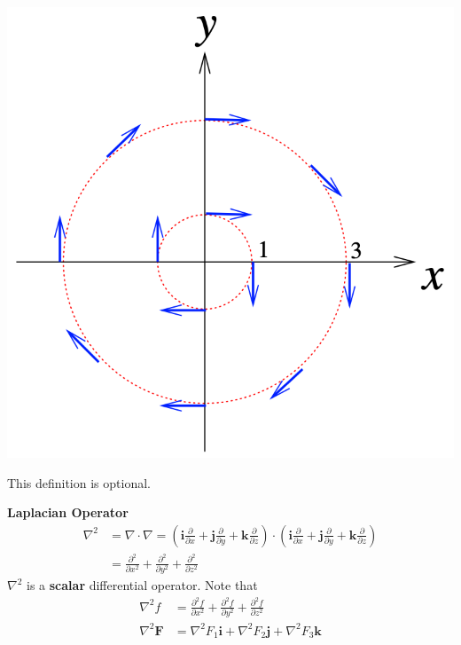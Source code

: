 \documentclass[11pt, a4paper]{MATH2023}
\begin{document}
\begin{spacing}{1.3}
    \begin{center}
        \includegraphics[scale=0.4]{images/Ch15-ex1.2.png}
    \end{center}

    \newpage
    {\blue This definition is optional.}
    
    {\bf Laplacian Operator}
    $$
    \begin{aligned}
    \nabla^{2} &=\nabla \cdot \nabla=\left(\mathbf{i} \frac{\partial}{\partial x}+\mathbf{j} \frac{\partial}{\partial y}+\mathbf{k} \frac{\partial}{\partial z}\right) \cdot\left(\mathbf{i} \frac{\partial}{\partial x}+\mathbf{j} \frac{\partial}{\partial y}+\mathbf{k} \frac{\partial}{\partial z}\right) \\
    &=\frac{\partial^{2}}{\partial x^{2}}+\frac{\partial^{2}}{\partial y^{2}}+\frac{\partial^{2}}{\partial z^{2}}
    \end{aligned}
    $$
    $\nabla^{2}$ is a {\bf scalar} differential operator. Note that
    $$
    \begin{aligned}
    \nabla^{2} f &=\frac{\partial^{2} f}{\partial x^{2}}+\frac{\partial^{2} f}{\partial y^{2}}+\frac{\partial^{2} f}{\partial z^{2}} \\
    \nabla^{2} \mathbf{F} &=\nabla^{2} F_{1} \mathbf{i}+\nabla^{2} F_{2} \mathbf{j}+\nabla^{2} F_{3} \mathbf{k}
    \end{aligned}
    $$


\end{spacing}
\end{document}
